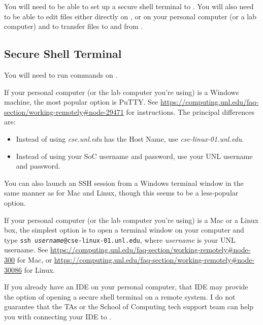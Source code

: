 
You will need to be able to set up a secure shell terminal to \runtimeenvironment.
You will also need to be able to edit files either directly on \runtimeenvironment, or on your personal computer (or a lab computer) and to transfer files to and from \runtimeenvironment.

\subsection{Secure Shell Terminal}

You will need to run commands on \runtimeenvironment.

If your personal computer (or the lab computer you're using) is a Windows machine, the most popular option is PuTTY\@.
See \url{https://computing.unl.edu/faq-section/working-remotely#node-29471} for instructions.
The principal differences are:
\begin{itemize}
\item Instead of using \textit{cse.unl.edu} has the Host Name, use \textit{cse-linux-01.unl.edu}.
\item Instead of using your SoC username and password, use your UNL username and password.
\end{itemize}

You can also launch an SSH session from a Windows terminal window in the same manner as for Mac and Linux, though this seems to be a less-popular option.

If your personal computer (or the lab computer you're using) is a Mac or a Linux box, the simplest option is to open a terminal window on your computer and type \texttt{ssh \textit{username}@cse-linux-01.unl.edu}, where \textit{username} is your UNL username.
See \url{https://computing.unl.edu/faq-section/working-remotely#node-300} for Mac, or \url{https://computing.unl.edu/faq-section/working-remotely#node-30086} for Linux.


If you already have an IDE on your personal computer, that IDE may provide the option of opening a secure shell terminal on a remote system.
I do not guarantee that the TAs or the School of Computing tech support team can help you with connecting your IDE to \runtimeenvironment.

